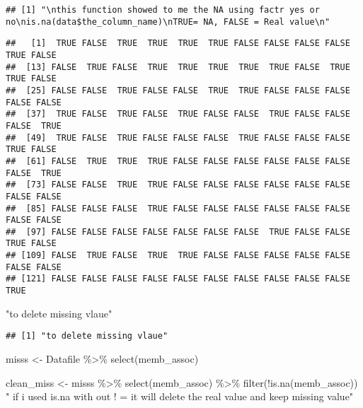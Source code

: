 \documentclass[
]{article}
\newenvironment{Shaded}{\begin{snugshade}}{\end{snugshade}}
\newcommand{\FunctionTok}[1]{\textcolor[rgb]{0.00,0.00,0.00}{#1}}
\newcommand{\NormalTok}[1]{#1}
\newcommand{\OtherTok}[1]{\textcolor[rgb]{0.56,0.35,0.01}{#1}}
\newcommand{\SpecialCharTok}[1]{\textcolor[rgb]{0.00,0.00,0.00}{#1}}
\newcommand{\StringTok}[1]{\textcolor[rgb]{0.31,0.60,0.02}{#1}}
\begin{document}
\begin{verbatim}
## [1] "\nthis function showed to me the NA using factr yes or no\nis.na(data$the_column_name)\nTRUE= NA, FALSE = Real value\n"
\end{verbatim}

\begin{Shaded}
\end{Shaded}

\begin{verbatim}
##   [1]  TRUE FALSE  TRUE  TRUE  TRUE  TRUE FALSE FALSE FALSE FALSE  TRUE FALSE
##  [13] FALSE  TRUE FALSE  TRUE  TRUE  TRUE  TRUE  TRUE FALSE  TRUE  TRUE FALSE
##  [25] FALSE FALSE  TRUE FALSE FALSE  TRUE  TRUE FALSE FALSE FALSE FALSE FALSE
##  [37]  TRUE FALSE  TRUE FALSE  TRUE FALSE FALSE  TRUE FALSE FALSE FALSE  TRUE
##  [49]  TRUE FALSE  TRUE FALSE FALSE FALSE  TRUE FALSE FALSE FALSE  TRUE FALSE
##  [61] FALSE  TRUE  TRUE  TRUE FALSE FALSE FALSE FALSE FALSE FALSE FALSE  TRUE
##  [73] FALSE FALSE  TRUE  TRUE FALSE FALSE FALSE FALSE FALSE FALSE FALSE FALSE
##  [85] FALSE FALSE FALSE  TRUE FALSE FALSE FALSE FALSE FALSE FALSE FALSE FALSE
##  [97] FALSE FALSE FALSE FALSE FALSE FALSE FALSE  TRUE FALSE FALSE  TRUE FALSE
## [109] FALSE  TRUE FALSE  TRUE  TRUE FALSE FALSE FALSE FALSE FALSE FALSE FALSE
## [121] FALSE FALSE FALSE FALSE FALSE FALSE FALSE FALSE FALSE FALSE  TRUE
\end{verbatim}

\begin{Shaded}
\begin{Highlighting}[]
\StringTok{"to delete missing vlaue"}
\end{Highlighting}
\end{Shaded}

\begin{verbatim}
## [1] "to delete missing vlaue"
\end{verbatim}

\begin{Shaded}
\begin{Highlighting}[]
\NormalTok{misss }\OtherTok{\textless{}{-}}\NormalTok{ Datafile }\SpecialCharTok{\%\textgreater{}\%} \FunctionTok{select}\NormalTok{(memb\_assoc)}

\NormalTok{clean\_miss }\OtherTok{\textless{}{-}}\NormalTok{ misss }\SpecialCharTok{\%\textgreater{}\%} \FunctionTok{select}\NormalTok{(memb\_assoc) }\SpecialCharTok{\%\textgreater{}\%} 
  \FunctionTok{filter}\NormalTok{(}\SpecialCharTok{!}\FunctionTok{is.na}\NormalTok{(memb\_assoc))}
\StringTok{"}
\StringTok{if i used is.na with out ! = it will delete the real value and keep missing value"}
\end{Highlighting}
\end{Shaded}
\end{document}
